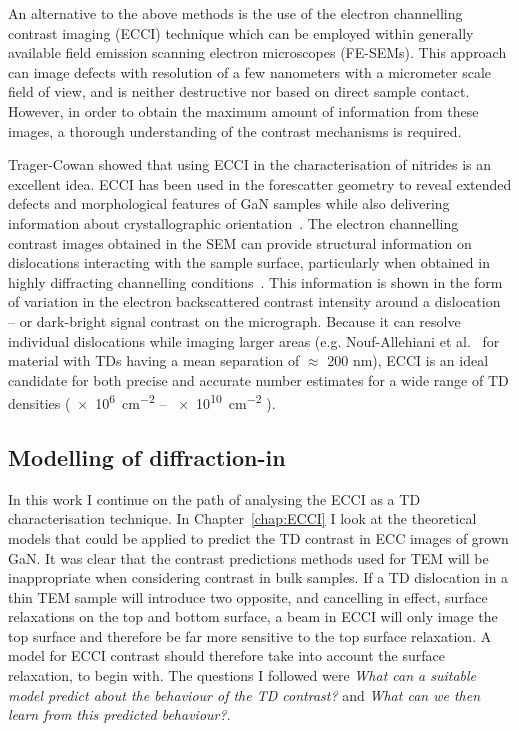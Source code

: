 An alternative to the above methods is the use of the electron  channelling contrast imaging (ECCI) technique which can be employed within generally available field emission scanning electron microscopes (FE-SEMs). This approach can image defects with resolution of a few nanometers with a micrometer scale field of view, and is neither destructive nor based on direct sample contact. However, in order to obtain the maximum amount of information from these images, a thorough understanding of the contrast mechanisms is required.

Trager-Cowan \etal\cite{Carol} showed that using ECCI in the characterisation of nitrides is an excellent idea. ECCI has been used in the forescatter geometry to reveal extended defects and
morphological features of GaN samples while also delivering information about crystallographic orientation~\cite{Picard}. The electron channelling contrast images obtained in the SEM can provide structural information on dislocations  interacting with the sample surface, particularly when obtained in highly diffracting channelling conditions~\cite{Naresh}. This information is shown in the form of variation in the electron backscattered contrast intensity around a dislocation -- or dark-bright signal contrast on the micrograph. Because it can resolve individual dislocations while imaging larger areas (e.g. Nouf-Allehiani et al.~\cite{Nouf} for material with TDs having a mean separation of $\approx$ 200 nm), ECCI is an ideal candidate for both precise and accurate number estimates for a wide range of TD densities (\SI{e6}{\centi \metre^{-2}} -- \SI{e10}{\centi \metre^{-2}} ).


\subsection{Modelling of diffraction-in}


In this work I continue on the path of analysing the ECCI as a TD characterisation technique. In Chapter~\ref{chap:ECCI} I look at the theoretical models that could be applied to predict the TD contrast in ECC images of \hkl[0001] grown GaN. It was clear that the contrast predictions methods used for TEM will be inappropriate when considering contrast in bulk samples. If a TD dislocation in a thin TEM sample will introduce two opposite, and cancelling in effect, surface relaxations on the top and bottom surface, a beam in ECCI will only image the top surface and therefore be far more sensitive to the top surface relaxation. A model for ECCI contrast should therefore take into account the surface relaxation, to begin with. The questions I followed were \textit{What can a suitable model predict about the behaviour of the TD contrast?} and \textit{What can we then learn from this predicted behaviour?}.

